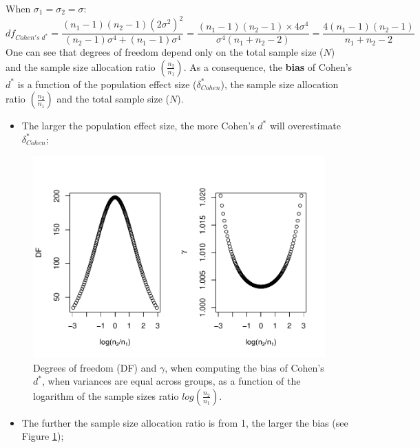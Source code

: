 \documentclass[
  english,
  man,mask]{apa6}
\providecommand{\tightlist}{%
  \setlength{\itemsep}{0pt}\setlength{\parskip}{0pt}}
\begin{document}
When \(\sigma_1=\sigma_2=\sigma\):
\[df_{Cohen's \; d^*} = \frac{(n_1-1)(n_2-1)(2\sigma^2)^2}{(n_2-1)\sigma^4+(n_1-1)\sigma^4} = \frac{(n_1-1)(n_2-1)\times 4\sigma^4}{\sigma^4(n_1+n_2-2)} = \frac{4(n_1-1)(n_2-1)}{n_1+n_2-2}\]
One can see that degrees of freedom depend only on the total sample size (\(N\)) and the sample size allocation ratio \(\left( \frac{n_2}{n_1}\right)\). As a consequence, the \textbf{bias} of Cohen's \(d^*\) is a function of the population effect size (\(\delta^*_{Cohen}\)), the sample size allocation ratio \(\left( \frac{n_2}{n_1}\right)\) and the total sample size (\(N\)).

\begin{itemize}
\tightlist
\item
  The larger the population effect size, the more Cohen's \(d^*\) will overestimate \(\delta^*_{Cohen}\);
\end{itemize}

\begin{figure}
\centering
\includegraphics{Theoretical-Bias-of-all-estimators-as-a-function-of-population-parameters_files/figure-latex/biascohendprimehomNratio2-1.pdf}
\caption{\label{fig:biascohendprimehomNratio2}Degrees of freedom (DF) and \(\gamma\), when computing the bias of Cohen's \(d^*\), when variances are equal across groups, as a function of the logarithm of the sample sizes ratio \(log\left(\frac{n_2}{n_1} \right)\).}
\end{figure}

\begin{itemize}
\tightlist
\item
  The further the sample size allocation ratio is from 1, the larger the bias (see Figure \ref{fig:biascohendprimehomNratio2});
\end{itemize}
\end{document}
